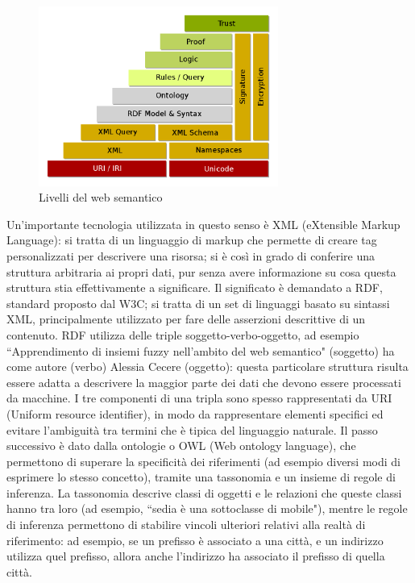 \documentclass[12pt,a4paper]{report}
\begin{document}
\begin{figure}[h]	
\centering
\includegraphics[width=0.7\textwidth]{images/semanticweblayers.png}
\caption{Livelli del web semantico}
\end{figure}


Un'importante tecnologia utilizzata in questo senso è XML (eXtensible Markup Language): si tratta di un linguaggio di markup che permette di creare tag personalizzati per descrivere una risorsa; si è così in grado di conferire una struttura arbitraria ai propri dati, pur senza avere informazione su cosa questa struttura stia effettivamente a significare.
Il significato è demandato a RDF, standard proposto dal W3C; si tratta di un set di linguaggi basato su sintassi XML, principalmente utilizzato per fare delle asserzioni descrittive di un contenuto. RDF utilizza delle triple soggetto-verbo-oggetto, ad esempio ``Apprendimento di insiemi fuzzy nell'ambito del web semantico" (soggetto) ha come autore (verbo) Alessia Cecere (oggetto): questa particolare struttura risulta essere adatta a descrivere la maggior parte dei dati che devono essere processati da macchine.
I tre componenti di una tripla sono spesso rappresentati da URI (Uniform resource identifier), in modo da rappresentare elementi specifici ed evitare l'ambiguità tra termini che è tipica del linguaggio naturale.
Il passo successivo è dato dalla ontologie o OWL (Web ontology language), che permettono di superare la specificità dei riferimenti (ad esempio diversi modi di esprimere lo stesso concetto), tramite una tassonomia e un insieme di regole di inferenza. La tassonomia descrive classi di oggetti e le relazioni che queste classi hanno tra loro (ad esempio, ``sedia è una sottoclasse di mobile"), mentre le regole di inferenza permettono di stabilire vincoli ulteriori relativi alla realtà di riferimento: ad esempio, se un prefisso è associato a una città, e un indirizzo utilizza quel prefisso, allora anche l'indirizzo ha associato il prefisso di quella città\cite{semanticWebPaper}. 
\end{document}
